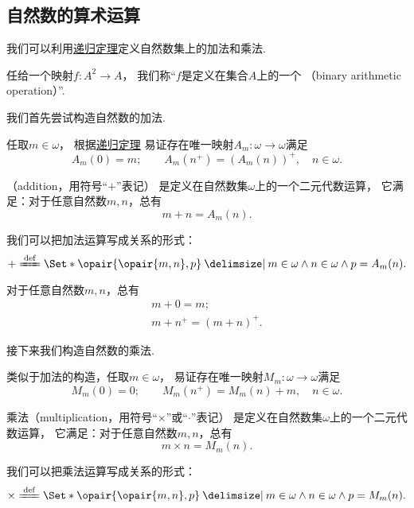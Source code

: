 \subsection{自然数的算术运算}
我们可以利用\hyperref[theorem:集合论.自然数集的递归定理]{递归定理}定义自然数集上的加法和乘法.

\begin{definition}
任给一个映射\(f\colon A^2 \to A\)，
我们称“\(f\)是定义在集合\(A\)上的一个%
（binary arithmetic operation）”.
\end{definition}

我们首先尝试构造自然数的加法.

任取\(m \in \omega\)，
根据\hyperref[theorem:集合论.自然数集的递归定理]{递归定理}%
易证存在唯一映射\(A_m\colon \omega \to \omega\)满足\[
	A_m(0) = m; \qquad
	A_m(n^+) = (A_m(n))^+, \quad n \in \omega.
\]
\begin{definition}
（addition，用符号“\(+\)”表记）%
是定义在自然数集\(\omega\)上的一个二元代数运算，
它满足：对于任意自然数\(m,n\)，总有\[
	m + n = A_m(n).
\]
\end{definition}
我们可以把加法运算写成关系的形式：\[
	+ \defeq \Set*{
		\opair{\opair{m,n},p}
		\given
		m \in \omega
		\land
		n \in \omega
		\land
		p = A_m(n)
	}.
\]

\begin{theorem}
对于任意自然数\(m,n\)，总有\begin{gather}
	m + 0 = m;
	\label{equation:集合论.自然数的加法.性质1} \\%
	m + n^+ = (m+n)^+.
	\label{equation:集合论.自然数的加法.性质2}%
\end{gather}
\end{theorem}

接下来我们构造自然数的乘法.

类似于加法的构造，任取\(m \in \omega\)，
易证存在唯一映射\(M_m\colon \omega \to \omega\)满足\[
	M_m(0) = 0; \qquad
	M_m(n^+) = M_m(n) + m, \quad n \in \omega.
\]
\begin{definition}
乘法（multiplication，用符号“\(\times\)”或“\(\cdot\)”表记）%
是定义在自然数集\(\omega\)上的一个二元代数运算，
它满足：对于任意自然数\(m,n\)，总有\[
	m \times n = M_m(n).
\]
\end{definition}
我们可以把乘法运算写成关系的形式：\[
	\times \defeq \Set*{
		\opair{\opair{m,n},p}
		\given
		m \in \omega
		\land
		n \in \omega
		\land
		p = M_m(n)
	}.
\]

